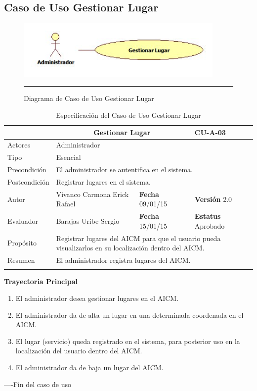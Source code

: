 \subsection{Caso de Uso Gestionar Lugar}

\begin{figure}[htbp]
	\centering
		\includegraphics[width=0.9\textwidth]{Figuras/cuGestionarLugar.png}
		\rule{30em}{0.5pt}
	\caption[Diagrama de Caso de Uso Gestionar Lugar]{Diagrama de Caso de Uso Gestionar Lugar}
	\label{fig:cuGestionarLugar}
\end{figure}

\begin{longtable}{|p{2.5cm}|p{6.4cm}|p{2cm}|p{2cm}|}
	\hline
		\rowcolor[RGB]{255,102,102}{Caso de Uso}&\multicolumn{2}{c}{Gestionar Lugar}&{\textbf{CU-A-03}}\\
	\hline
		{Actores}&\multicolumn{3}{p{11.2cm}|}{Administrador}\\
	\hline
		{Tipo}&\multicolumn{3}{p{11.2cm}|}{Esencial}\\
	\hline
		{Precondición}&\multicolumn{3}{p{11.2cm}|}{El administrador se autentifica en el sistema.}\\
	\hline
		{Postcondición}&\multicolumn{3}{p{11.2cm}|}{Registrar lugares en el sistema.}\\
	\hline
		{Autor}&{Vivanco Carmona Erick Rafael}&{\textbf{Fecha} 09/01/15}&{\textbf{Versión} 2.0}\\
			\hline
		{Evaluador}&{Barajas Uribe Sergio}&{\textbf{Fecha} 15/01/15}&{\textbf{Estatus} Aprobado}\\
	\hline
		{Propósito}&\multicolumn{3}{p{11.2cm}|}{Registrar lugares del AICM para que el usuario pueda visualizarlos en su localización dentro del AICM.}\\
	\hline
		{Resumen}&\multicolumn{3}{p{11.2cm}|}{El administrador registra lugares del AICM.}\\	
	\hline
	\caption[Especificación del Caso de Uso Gestionar Lugar]{Especificación del Caso de Uso Gestionar Lugar}
    	\label{tab:cuGestionarLugar}
\end{longtable}
\newpage
\begin{flushleft}
	\textbf{Trayectoria Principal}\\
	\begin{enumerate}
		\item El administrador desea gestionar lugares en el AICM.
		\item El administrador da de alta un lugar en una determinada coordenada en el AICM.
		\item El lugar (servicio) queda registrado en el sistema, para posterior uso en la localización del usuario dentro del AICM.
		\item El administrador da de baja un lugar del AICM.
	\end{enumerate}
\end{flushleft}
----Fin del caso de uso